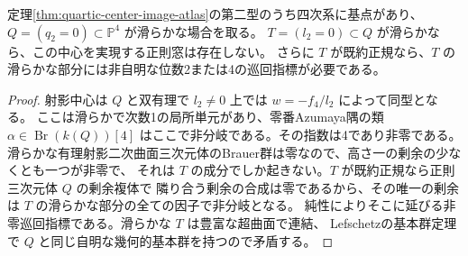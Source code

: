 \begin{proposition}\label{prop:quadric-pole-residue-test}
定理\ref{thm:quartic-center-image-atlas}の第二型のうち四次系に基点があり、
$Q=(q_2=0)\subset\mathbb P^4$ が滑らかな場合を取る。
$T=(l_2=0)\subset Q$ が滑らかなら、この中心を実現する正則窓は存在しない。
さらに $T$ が既約正規なら、$T$ の滑らかな部分には非自明な位数2または4の巡回指標が必要である。
\end{proposition}
\begin{proof}
射影中心は $Q$ と双有理で $l_2\ne0$ 上では $w=-f_4/l_2$ によって同型となる。
ここは滑らかで次数1の局所単元があり、零番Azumaya隅の類
$\alpha\in\operatorname{Br}(k(Q))[4]$ はここで非分岐である。その指数は4であり非零である。
滑らかな有理射影二次曲面三次元体のBrauer群は零なので、高さ一の剰余の少なくとも一つが非零で、
それは $T$ の成分でしか起きない。$T$ が既約正規なら正則三次元体 $Q$ の剰余複体で
隣り合う剰余の合成は零であるから、その唯一の剰余は $T$ の滑らかな部分の全ての因子で非分岐となる。
純性によりそこに延びる非零巡回指標である。滑らかな $T$ は豊富な超曲面で連結、
Lefschetzの基本群定理で $Q$ と同じ自明な幾何的基本群を持つので矛盾する。
\end{proof}

